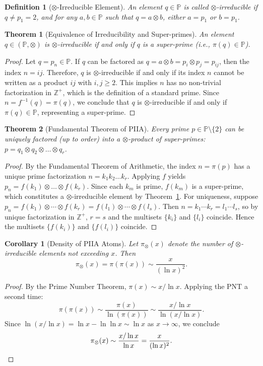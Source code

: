\documentclass[11pt, a4paper]{article}
\newtheorem{theorem}{Theorem}
\newtheorem{definition}{Definition}
\newtheorem{corollary}{Corollary}
\begin{document}
\begin{definition}[$\otimes$-Irreducible Element]\label{def:irred}
An element $q \in \mathbb{P}$ is called $\otimes$-irreducible if $q \neq p_1 = 2$, and for any $a, b \in \mathbb{P}$ such that $q = a \otimes b$, either $a = p_1$ or $b = p_1$.
\end{definition}

\begin{theorem}[Equivalence of Irreducibility and Super-primes]\label{thm:superp}
An element $q \in (\mathbb{P}, \otimes)$ is $\otimes$-irreducible if and only if $q$ is a super-prime (i.e., $\pi(q) \in \mathbb{P}$).
\end{theorem}
\begin{proof}
Let $q = p_n \in \mathbb{P}$. If $q$ can be factored as $q = a \otimes b = p_i \otimes p_j = p_{ij}$, then the index $n = ij$. Therefore, $q$ is $\otimes$-irreducible if and only if its index $n$ cannot be written as a product $ij$ with $i, j \geq 2$. This implies $n$ has no non-trivial factorization in $\mathbb{Z}^+$, which is the definition of a standard prime. Since $n = f^{-1}(q) = \pi(q)$, we conclude that $q$ is $\otimes$-irreducible if and only if $\pi(q) \in \mathbb{P}$, representing a super-prime.
\end{proof}

\begin{theorem}[Fundamental Theorem of PIIA]\label{thm:fta}
Every prime $p \in \mathbb{P} \setminus \{2\}$ can be uniquely factored (up to order) into a $\otimes$-product of super-primes: $p = q_1 \otimes q_2 \otimes \dots \otimes q_r$.
\end{theorem}
\begin{proof}
By the Fundamental Theorem of Arithmetic, the index $n = \pi(p)$ has a unique prime factorization $n = k_1 k_2 \dots k_r$. Applying $f$ yields $p_n = f(k_1) \otimes \dots \otimes f(k_r)$. Since each $k_m$ is prime, $f(k_m)$ is a super-prime, which constitutes a $\otimes$-irreducible element by Theorem~\ref{thm:superp}. For uniqueness, suppose $p_n = f(k_1) \otimes \cdots \otimes f(k_r) = f(l_1) \otimes \cdots \otimes f(l_s)$. Then $n = k_1 \cdots k_r = l_1 \cdots l_s$, so by unique factorization in $\mathbb{Z}^+$, $r = s$ and the multisets $\{k_i\}$ and $\{l_i\}$ coincide. Hence the multisets $\{f(k_i)\}$ and $\{f(l_i)\}$ coincide.
\end{proof}

\begin{corollary}[Density of PIIA Atoms]\label{cor:density}
Let $\pi_{\otimes}(x)$ denote the number of $\otimes$-irreducible elements not exceeding $x$. Then
\begin{equation}
\pi_{\otimes}(x) = \pi(\pi(x)) \sim \frac{x}{(\ln x)^2}.
\end{equation}
\end{corollary}
\begin{proof}
By the Prime Number Theorem, $\pi(x) \sim x / \ln x$. Applying the PNT a second time:
\[
\pi(\pi(x)) \sim \frac{\pi(x)}{\ln(\pi(x))} \sim \frac{x / \ln x}{\ln(x / \ln x)}.
\]
Since $\ln(x / \ln x) = \ln x - \ln \ln x \sim \ln x$ as $x \to \infty$, we conclude
\[
\pi_{\otimes}(x) \sim \frac{x / \ln x}{\ln x} = \frac{x}{(\ln x)^2}. \qedhere
\]
\end{proof}
\end{document}
